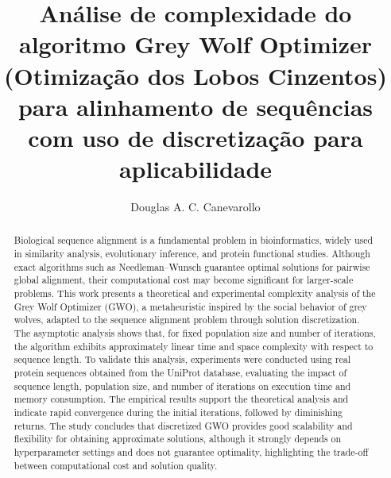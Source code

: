 \documentclass[12pt]{article}
\title{Análise de complexidade do algoritmo Grey Wolf Optimizer\\(Otimização dos Lobos Cinzentos)\\para alinhamento de sequências com uso de discretização para\\aplicabilidade}
\author{Douglas A. C. Canevarollo\inst{1}}
\begin{document}
\maketitle

\begin{abstract}
    Biological sequence alignment is a fundamental problem in bioinformatics, widely used in similarity analysis, evolutionary inference, and protein functional studies. Although exact algorithms such as Needleman–Wunsch guarantee optimal solutions for pairwise global alignment, their computational cost may become significant for larger-scale problems. This work presents a theoretical and experimental complexity analysis of the Grey Wolf Optimizer (GWO), a metaheuristic inspired by the social behavior of grey wolves, adapted to the sequence alignment problem through solution discretization. The asymptotic analysis shows that, for fixed population size and number of iterations, the algorithm exhibits approximately linear time and space complexity with respect to sequence length. To validate this analysis, experiments were conducted using real protein sequences obtained from the UniProt database, evaluating the impact of sequence length, population size, and number of iterations on execution time and memory consumption. The empirical results support the theoretical analysis and indicate rapid convergence during the initial iterations, followed by diminishing returns. The study concludes that discretized GWO provides good scalability and flexibility for obtaining approximate solutions, although it strongly depends on hyperparameter settings and does not guarantee optimality, highlighting the trade-off between computational cost and solution quality.
\end{abstract}
\end{document}
